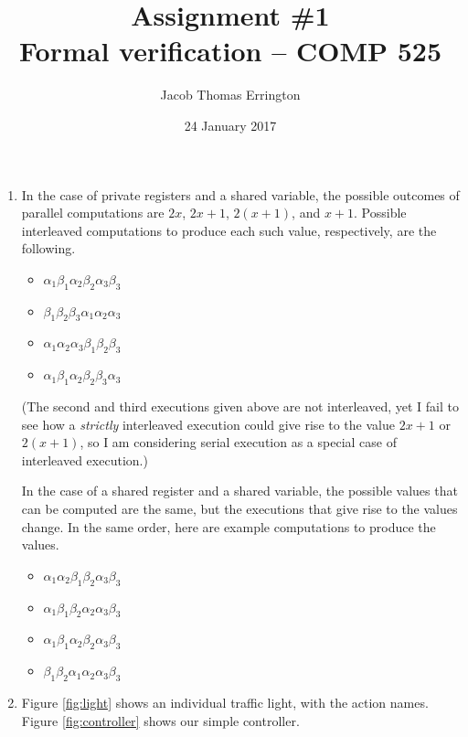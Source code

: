 \documentclass[11pt,letterpaper]{article}
\author{Jacob Thomas Errington}
\title{Assignment \#1\\Formal verification -- COMP 525}
\date{24 January 2017}
\newcommand{\ai}{\alpha_1}
\newcommand{\aii}{\alpha_2}
\newcommand{\aiii}{\alpha_3}
\newcommand{\bi}{\beta_1}
\newcommand{\bii}{\beta_2}
\newcommand{\biii}{\beta_3}
\begin{document}
\maketitle

\begin{enumerate}
    \item
        In the case of private registers and a shared variable, the possible
        outcomes of parallel computations are $2x$, $2x + 1$, $2(x + 1)$, and
        $x + 1$. Possible interleaved computations to produce each such value,
        respectively, are the following.
        \begin{itemize}
            \item $\alpha_1 \beta_1 \alpha_2 \beta_2 \alpha_3 \beta_3$ %
            \item $\beta_1 \beta_2 \beta_3 \alpha_1 \alpha_2 \alpha_3$ %
            \item $\alpha_1 \alpha_2 \alpha_3 \beta_1 \beta_2 \beta_3$ %
            \item $\alpha_1 \beta_1 \alpha_2 \beta_2 \beta_3 \alpha_3$ %
        \end{itemize}
        (The second and third executions given above are not
        interleaved, yet I fail to see how a \emph{strictly} interleaved
        execution could give rise to the value $2x + 1$ or $2(x + 1)$, so I am
        considering serial execution as a special case of interleaved
        execution.)

        In the case of a shared register and a shared variable, the possible
        values that can be computed are the same, but the executions that give
        rise to the values change. In the same order, here are example
        computations to produce the values.
        \begin{itemize}
            \item $\ai \aii \bi \bii \aiii \biii$ %
            \item $\ai \bi \bii \aii \aiii \biii$ %
            \item $\ai \bi \aii \bii \aiii \biii$ %
            \item $\bi \bii \ai \aii \aiii \biii$ %
        \end{itemize}

    \item Figure \ref{fig:light} shows an individual traffic light, with the
        action names. Figure \ref{fig:controller} shows our simple controller.


\end{enumerate}
\end{document}
